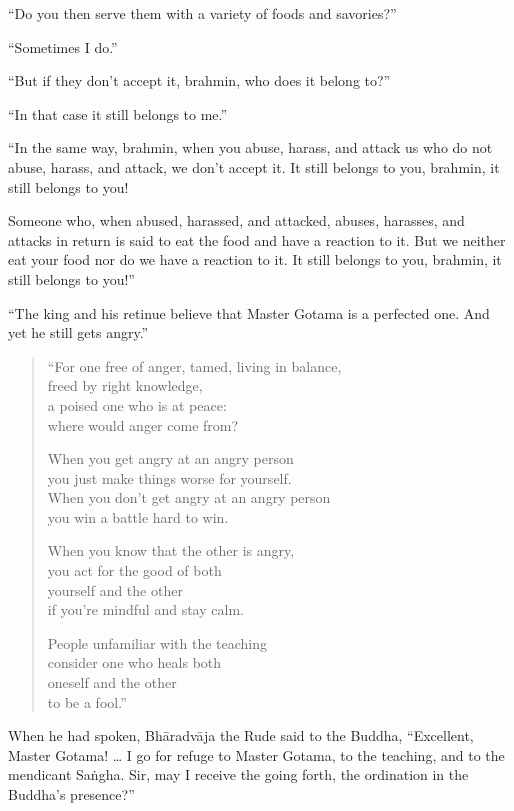 \documentclass[12pt,openany]{book}%
\begin{document}
“Do you then serve them with a variety of foods and savories?” 

“Sometimes I do.” 

“But if they don’t accept it, brahmin, who does it belong to?” 

“In that case it still belongs to me.” 

“In the same way, brahmin, when you abuse, harass, and attack us who do not abuse, harass, and attack, we don’t accept it. It still belongs to you, brahmin, it still belongs to you! 

Someone who, when abused, harassed, and attacked, abuses, harasses, and attacks in return is said to eat the food and have a reaction to it. But we neither eat your food nor do we have a reaction to it. It still belongs to you, brahmin, it still belongs to you!” 

“The king and his retinue believe that Master Gotama is a perfected one. And yet he still gets angry.” 

\begin{verse}%
“For one free of anger, tamed, living in balance, \\
freed by right knowledge, \\
a poised one who is at peace: \\
where would anger come from? 

When you get angry at an angry person \\
you just make things worse for yourself. \\
When you don’t get angry at an angry person \\
you win a battle hard to win. 

When you know that the other is angry, \\
you act for the good of both \\
yourself and the other \\
if you’re mindful and stay calm. 

People unfamiliar with the teaching \\
consider one who heals both \\
oneself and the other \\
to be a fool.” 

%
\end{verse}

When he had spoken, \textsanskrit{Bhāradvāja} the Rude said to the Buddha, “Excellent, Master Gotama! … I go for refuge to Master Gotama, to the teaching, and to the mendicant \textsanskrit{Saṅgha}. Sir, may I receive the going forth, the ordination in the Buddha’s presence?” 
\end{document}
